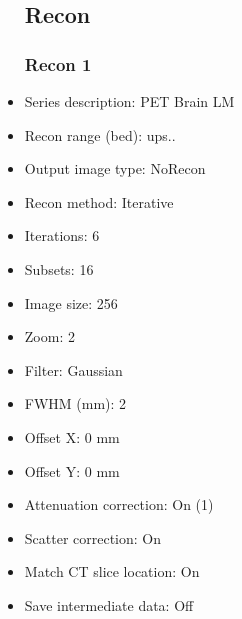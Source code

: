 \documentclass[12pt]{article}
\begin{document}
\begin{itemize}
\subsection{Recon}

\subsubsection{Recon 1}
\item Series description: PET Brain LM
\item Recon range (bed): ups..
\item Output image type: NoRecon
\item Recon method: Iterative
\item Iterations: 6
\item Subsets: 16
\item Image size: 256
\item Zoom: 2
\item Filter: Gaussian
\item FWHM (mm): 2
\item Offset X: 0 mm
\item Offset Y: 0 mm
\item Attenuation correction: On (1)
\item Scatter correction: On
\item Match CT slice location: On
\item Save intermediate data: Off
\end{itemize}
\end{document}
